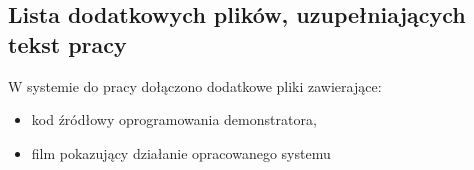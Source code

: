\documentclass[a4paper,twoside,12pt]{book}
\begin{document}
\begin{appendices}
\chapter{Lista dodatkowych plików, uzupełniających tekst pracy} 

W systemie do pracy dołączono dodatkowe pliki zawierające:
\begin{itemize}
\item kod źródłowy oprogramowania demonstratora,
\item film pokazujący działanie opracowanego systemu
\end{itemize}


\listoffigures
{}
\listoftables
{}

\end{appendices}
\end{document}
